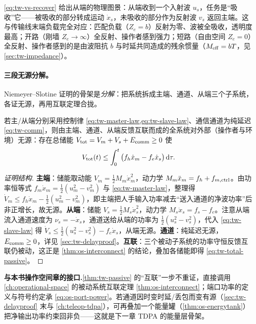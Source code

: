 \begin{insight}
\cref{eq:tw-vs-recover} 给出从端的物理图景：从端收到一个入射波 $u_s$，任务是“吸收”它——被吸收的部分转成运动 $\dot x_s$，未吸收的部分作为反射波 $v_s$ 返回主端。这与传输线末端负载完全对应：匹配负载（$Z_e=b$）反射为零、波被全吸收，透明度最高；开路（刚墙 $Z_e\to\infty$）全反射、操作者感到强力；短路（自由空间 $Z_e=0$）全反射、操作者感到的是由波阻抗 $b$ 与时延共同造成的残余惯量（$M_{\rm eff}=bT$，见 \cref{sec:tw-impedance}）。
\end{insight}

\paragraph{三段无源分解。}
Niemeyer--Slotine 证明的骨架是\emph{分解}：把系统拆成主端、通道、从端三个子系统，各证无源，再用互联定理合拢。

\begin{theorem}\label{thm:tw-passive}
若主/从端分别采用控制律 \cref{eq:tw-master-law,eq:tw-slave-law}、通信通道为纯延迟 \cref{eq:tw-comm}，则由主端、通道、从端反馈互联而成的全系统对外部（操作者与环境）无源：存在总储能 $V_{\rm tot}=V_m+V_s+E_{\rm comm}\ge0$ 使
\begin{equation}
  V_{\rm tot}(t)\le\int_0^t\big(f_h\dot x_m-f_e\dot x_s\big)\,\mathrm d\tau.
  \label{eq:tw-total-passive}
\end{equation}
\end{theorem}
\begin{proof}[证明结构]
\textbf{主端}：储能取动能 $V_m=\tfrac12M_m\dot x_m^2$，动力学 $M_m\ddot x_m=f_h+f_{m,\rm ctrl}$。由功率恒等式 $f_m\dot x_m=\tfrac12(u_m^2-v_m^2)$ 与 \cref{eq:tw-master-law}，整理得 $\dot V_m\le f_h\dot x_m-\tfrac12(u_m^2-v_m^2)$，即主端把人手输入功率减去“送入通道的净波功率”后非正增长，故无源。\textbf{从端}：储能 $V_s=\tfrac12M_s\dot x_s^2$，动力学 $M_s\ddot x_s=f_s-f_e$。注意从端流入通道速度为 $\nu_s=-\dot x_s$，通道送给从端的功率为 $\tfrac12(u_s^2-v_s^2)$，代入 \cref{eq:tw-slave-law} 得 $\dot V_s\le\tfrac12(u_s^2-v_s^2)-f_e\dot x_s$，从端无源。\textbf{通道}：纯延迟无源，$E_{\rm comm}\ge0$，详见 \cref{sec:tw-delayproof}。\textbf{互联}：三个被动子系统的功率守恒反馈互联仍被动，这正是 \cref{thm:os-interconnect} 的结论，叠加各储能即得 \cref{eq:tw-total-passive}。
\end{proof}

\begin{note}
\textbf{与本书操作空间章的接口.}\;\cref{thm:tw-passive} 的“互联”一步不重证，直接调用 \cref{ch:operational-space} 的被动系统互联定理 \cref{thm:os-interconnect}；端口功率的定义与符号约定承 \cref{eq:os-port-power}。若通道因时变时延/丢包而变有源（\cref{sec:tw-delayproof} 末与 \cref{ch:teleop-tdpa}），可再叠加一个能量罐（\cref{thm:os-energytank}）把净输出功率约束回非负——这就是下一章 TDPA 的能量层骨架。
\end{note}

